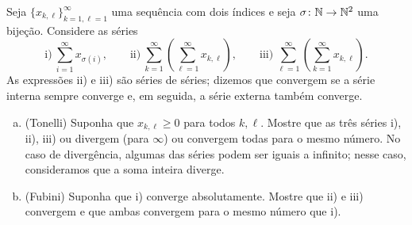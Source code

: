 \begin{exercise}
\label{exercise:tonellifubiniforsums}%
%
Seja $\{ x_{k,\ell} \}_{k=1,\ell=1}^\infty$ uma sequência com dois
índices e seja $\sigma \colon {\mathbb{N}} \to {\mathbb{N}}^2$ uma bijeção.
Considere as séries
\begin{equation*}
\text{i)}~\sum_{i=1}^\infty x_{\sigma(i)},
\qquad
\text{ii)}~\sum_{k=1}^\infty \left( \sum_{\ell=1}^\infty x_{k,\ell} \right),
\qquad
\text{iii)}~\sum_{\ell=1}^\infty \left( \sum_{k=1}^\infty x_{k,\ell} \right) .
\end{equation*}
As expressões ii) e iii) são séries de séries; dizemos que convergem
se a série interna sempre converge e, em seguida, a série externa também
converge.
\begin{enumerate}[a)]
\item
(Tonelli) Suponha que $x_{k,\ell} \geq 0$ para todos $k,\ell$.
Mostre que as três séries i), ii), iii) ou divergem (para $\infty$)
ou convergem todas para o mesmo número.
No caso de divergência, algumas das séries  podem ser iguais a infinito;
nesse caso, consideramos que a soma inteira diverge.
\item
(Fubini) Suponha que i) converge absolutamente. Mostre que ii) e iii)
convergem e que ambas convergem para o mesmo número que i).
\end{enumerate}
\end{exercise}
